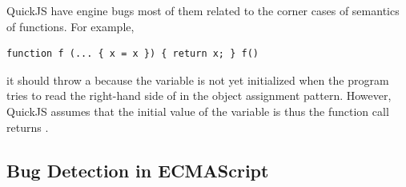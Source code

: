 QuickJS have \inred{-} engine bugs most of them related to the corner cases of
semantics of functions.  For example,
\begin{lstlisting}[style=myJSstyle]
function f (... { x = x }) { return x; } f()
\end{lstlisting}
it should throw a  because the variable  is not yet
initialized when the program tries to read the right-hand side of 
in the object assignment pattern.  However, QuickJS assumes that the initial
value of the variable  is  thus the function call
 returns .


\subsection{Bug Detection in ECMAScript}

